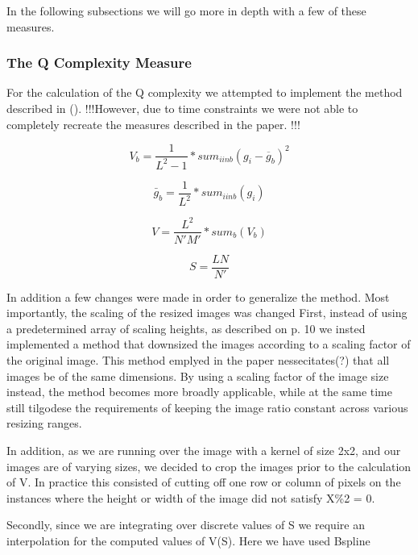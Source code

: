 \documentclass[12pt]{article}
\begin{document}
In the following subsections we will go more in depth with a few of these measures.

\subsubsection{The Q Complexity Measure}

For the calculation of the Q complexity we attempted to implement the method described in (\cite{zanetteQuantifyingComplexityBlackandwhite2018}). !!!However, due to time constraints we were not able to completely recreate the measures described in the paper. !!!

\begin{equation}
	V_b = \frac{1}{L^2-1}*sum_{i in b}(g_i-\overline{g}_b)^2
	\label{eq:Q1}
\end{equation} 

\begin{equation}
	\bar{g}_b = \frac{1}{L^2}*sum_{i in b}(g_i)
	\label{eq:Q2}
\end{equation} 

\begin{equation}
	V = \frac{L^2}{N'M'}*sum_{b}(V_b)
	\label{eq:Q3}
\end{equation} 

\begin{equation}
	S = \frac{LN}{N'}
	\label{eq:Q4}
\end{equation} 

In addition a few changes were made in order to generalize the method. Most importantly, the scaling of the resized images was changed
First, instead of using a predetermined array of scaling heights, as described on p. 10 we insted implemented a method that downsized the images according to a scaling factor of the original image. This method emplyed in the paper nessecitates(?) that all images be of the same dimensions. By using a scaling factor of the image size instead, the method becomes more broadly applicable, while at the same time still tilgodese the requirements of keeping the image ratio constant across various resizing ranges.

In addition, as we are running over the image with a kernel of size 2x2, and our images are of varying sizes, we decided to crop the images prior to the calculation of V. In practice this consisted of cutting off one row or column of pixels on the instances where the height or width of the image did not satisfy X\%2 = 0.

Secondly, since we are integrating over discrete values of S we require an interpolation for the computed values of V(S). Here we have used Bspline 
\end{document}
